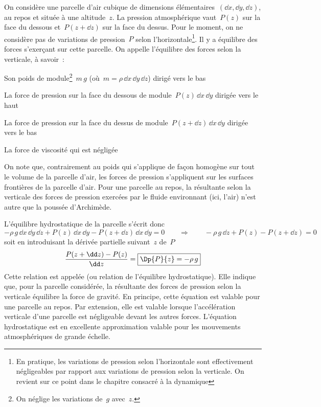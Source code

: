 \sk
On considère une parcelle d'air cubique de dimensions élémentaires~$(\dd x,\dd y, \dd z)$, au repos et située à une altitude~$z$. La pression atmosphérique vaut~$P(z)$ sur la face du dessous et~$P(z+\dd z)$ sur la face du dessus. Pour le moment, on ne considère pas de variations de pression~$P$ selon l'horizontale\footnote{En pratique, les variations de pression selon l'horizontale sont effectivement négligeables par rapport aux variations de pression selon la verticale. On revient sur ce point dans le chapitre consacré à la dynamique}. Il y a équilibre des forces s'exerçant sur cette parcelle. On appelle  l'équilibre des forces selon la verticale, à savoir~:
\begin{citemize}
\item Son poids de module\footnote{On néglige les variations de~$g$ avec~$z$.}~$m \, g$ (où~$m = \rho \, \dd x \, \dd y \, \dd z$) dirigé vers le bas
\item La force de pression sur la face du dessous de module~$P(z) \, \dd x \, \dd y$ dirigée vers le haut
\item La force de pression sur la face du dessus de module~$P(z+\dd z) \, \dd x \, \dd y$ dirigée vers le bas
\item La force de viscosité qui est négligée
\end{citemize}
On note que, contrairement au poids qui s'applique de façon homogène sur tout le volume de la parcelle d'air, les forces de pression s'appliquent sur les surfaces frontières de la parcelle d'air. 
Pour une parcelle au repos, la résultante selon la verticale des forces de pression exercées par le fluide environnant (ici, l'air) n'est autre que la poussée d'Archimède.

\sk
L'équilibre hydrostatique de la parcelle s'écrit donc
\[ - \rho \, g \, \dd x \, \dd y \, \dd z + P(z) \, \dd x \, \dd y - P(z+\dd z) \, \dd x \, \dd y = 0 \qquad \Rightarrow \qquad - \rho \, g \, \dd z + P(z) - P(z+\dd z) = 0 \]
soit en introduisant la dérivée partielle suivant~$z$ de~$P$
\[ \frac{P(z+\dd z) - P(z)}{\dd z} = \boxed{ \Dp{P}{z} = - \rho \, g } \]
Cette relation est appelée  (ou relation de l'équilibre hydrostatique). Elle indique que, pour la parcelle considérée, la résultante des forces de pression selon la verticale équilibre la force de gravité. En principe, cette équation est valable pour une parcelle au repos. Par extension, elle est valable lorsque l'accélération verticale d'une parcelle est négligeable devant les autres forces. L'équation hydrostatique est en excellente approximation valable pour les mouvements atmosphériques de grande échelle. 

